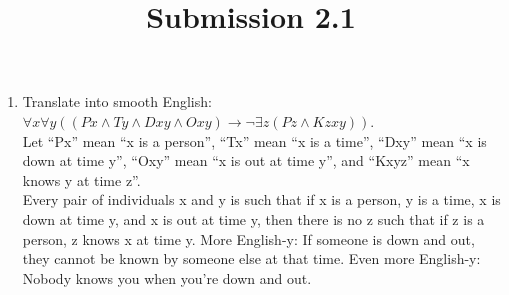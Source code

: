 \documentclass{article}
\title{Submission 2.1}
\date{}
\begin{document}
\maketitle

\begin{enumerate}
      \item Translate into smooth English: $\forall x\forall y((Px \land Ty \land Dxy \land Oxy) \to \neg \exists z(Pz \land Kzxy))$.\\
            Let “Px” mean “x is a person”, “Tx” mean “x is a time”, “Dxy” mean “x is down at time y”, “Oxy” mean “x is out at time y”, and “Kxyz” mean “x knows y at time z”.\\
            Every pair of individuals x and y is such that if x is a person, y is a time, x is down at time y, and x is out at time y, then there is no z such that if z is a person, z knows x at time y. More English-y: If someone is down and out, they cannot be known by someone else at that time. Even more English-y: Nobody knows you when you're down and out.
\end{enumerate}
\end{document}
